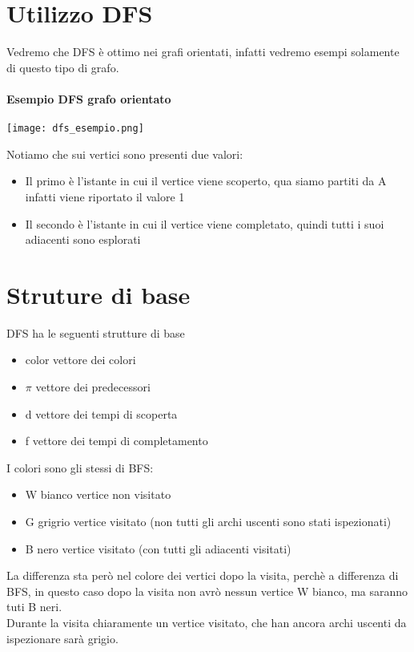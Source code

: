 \section{Utilizzo DFS}
Vedremo che DFS è ottimo nei grafi orientati, infatti vedremo esempi solamente di questo
tipo di grafo.
\paragraph*{Esempio DFS grafo orientato}
\begin{center}
    \texttt{[image: dfs\_esempio.png]}
\end{center}
Notiamo che sui vertici sono presenti due valori:
\begin{itemize}
    \item Il primo è l'istante in cui il vertice viene scoperto, qua siamo partiti da A infatti viene
    riportato il valore 1
    \item Il secondo è l'istante in cui il vertice viene completato, quindi tutti i suoi
    adiacenti sono esplorati
\end{itemize}
\section{Struture di base}
DFS ha le seguenti strutture di base
\begin{itemize}
    \item color \ra vettore dei colori
    \item $\pi$ \ra vettore dei predecessori
    \item d \ra vettore dei tempi di scoperta
    \item f \ra vettore dei tempi di completamento
\end{itemize}
I colori sono gli stessi di BFS:
\begin{itemize}
    \item W bianco \ra vertice non visitato
    \item G grigrio \ra vertice visitato (non tutti gli archi uscenti sono stati ispezionati)
    \item B nero \ra vertice visitato (con tutti gli adiacenti visitati)
\end{itemize}
La differenza sta però nel colore dei vertici dopo la visita, perchè a differenza di BFS,
in questo caso dopo la visita non avrò nessun vertice W bianco, ma saranno tuti B neri.\\
Durante la visita chiaramente un vertice visitato, che han ancora archi uscenti da ispezionare
sarà grigio.
